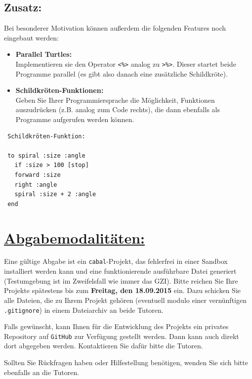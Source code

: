 \documentclass[10pt,a4paper]{article}
\begin{document}
\subsection*{Zusatz:}

Bei besonderer Motivation können außerdem die folgenden Features noch eingebaut werden:\bigskip
 
\begin{minipage}{0.68\linewidth}
\begin{itemize}
\item \textbf{Parallel Turtles:}\\ Implementieren sie den Operator \texttt{<\%>} analog zu \texttt{>\%>}. Dieser startet beide Programme parallel (es gibt also danach eine zusätzliche Schildkröte).
\item \textbf{Schildkröten-Funktionen:}\\ Geben Sie Ihrer Programmiersprache die Möglichkeit, Funktionen auszudrücken (z.B. analog zum Code rechts), die dann ebenfalls als Programme aufgerufen werden können.
\end{itemize}
\end{minipage}
\hfill
\begin{minipage}{0.3\linewidth}
\begin{verbatim}
 Schildkröten-Funktion:
 
 to spiral :size :angle
   if :size > 100 [stop]
   forward :size
   right :angle
   spiral :size + 2 :angle
 end
\end{verbatim}
\end{minipage}

\section*{\underline{Abgabemodalitäten:}}

Eine gültige Abgabe ist ein \texttt{cabal}-Projekt, das fehlerfrei in einer Sandbox installiert werden kann und eine funktionierende ausführbare Datei generiert (Testumgebung ist im Zweifelsfall wie immer das GZI). Bitte reichen Sie Ihre Projekte spätestens bis zum \textbf{Freitag, den 18.09.2015} ein.
Dazu schicken Sie alle Dateien, die zu Ihrem Projekt gehören (eventuell modulo einer vernünftigen \texttt{.gitignore}) in einem Dateiarchiv an beide Tutoren.\bigskip

Falls gewünscht, kann Ihnen für die Entwicklung des Projekts ein privates Repository auf \texttt{GitHub} zur Verfügung gestellt werden. Dann kann auch direkt dort abgegeben werden. Kontaktieren Sie dafür bitte die Tutoren.\bigskip

Sollten Sie Rückfragen haben oder Hilfestellung benötigen, wenden Sie sich bitte ebenfalls an die Tutoren.
\end{document}
